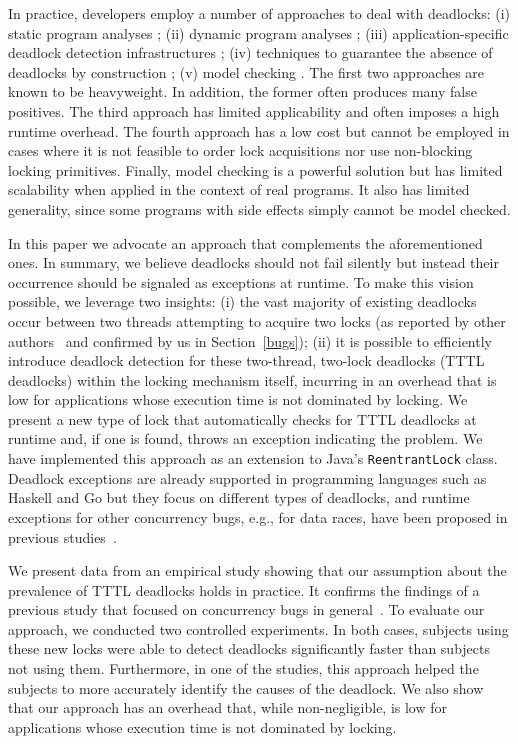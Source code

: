 In practice, developers employ a number of approaches to deal with deadlocks:
(i) static program analyses \cite{marino}\cite{dawson}\cite{vivek}\cite{williams};
(ii) dynamic program analyses \cite{mcsdk}\cite{magicfuzzer}\cite{sammati}\cite{serenity}\cite{pyla}\cite{rx};
(iii) application-specific deadlock detection infrastructu\-res \cite{orderedlock};
(iv) techniques to guarantee the absence of deadlocks by construction \cite{marino};
(v) model checking \cite{havelund}.
The first two approaches are known to be heavyweight. In addition, the former often produces many false positives.
The third approach has limited applicability and often imposes a high runtime overhead.
The fourth approach has a low cost but cannot be employed in cases where it is not feasible to order lock acquisitions nor use non-blocking locking primitives.
Finally, model checking is a powerful solution but has limited scalability when applied in the context of real programs. It also has limited generality, since some programs with side effects simply cannot be model checked.

In this paper we advocate an approach that complements the aforementioned ones.
In summary, we believe deadlocks should not fail silently but instead their occurrence should be signaled as exceptions at runtime.
To make this vision possible, we leverage two insights:
(i) the vast majority of existing deadlocks occur between two threads attempting to acquire two locks (as reported by other authors~\cite{lu} and confirmed by us in Section~\ref{bugs});
(ii) it is possible to efficiently introduce deadlock detection for these two-thread, two-lock deadlocks (TTTL deadlocks) within the locking mechanism itself, incurring in an overhead that is low for applications whose execution time is not dominated by locking.
We present a new type of lock that automatically checks for TTTL deadlocks at runtime and, if one is found, throws an exception indicating the problem.
We have implemented this approach as an extension to Java's {\tt ReentrantLock} class.
Deadlock exceptions are already supported in programming languages such as Haskell \cite{marlow} and Go \cite{golang} but they focus on different types of deadlocks, and runtime exceptions for other concurrency bugs, e.g., for data races, have been proposed in previous studies~\cite{valor}.

We present data from an empirical study showing that our assumption about the prevalence of TTTL deadlocks holds in practice. It confirms the findings of a previous study that focused on concurrency bugs in general~\cite{lu}. 
To evaluate our approach, we conducted two controlled experiments. In both cases, subjects using these new locks were able to detect deadlocks significantly faster than subjects not using them.  Furthermore, in one of the studies, this approach helped the subjects to more accurately identify the causes of the deadlock. We also show that our approach has an overhead that, while non-negligible, is low for applications whose execution time is not dominated by locking.

